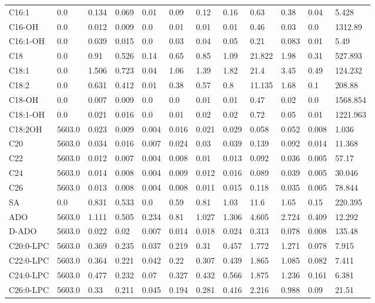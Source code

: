 \begin{tabular}{llllllllllll}
C16:1 & 0.0 & 0.134 & 0.069 & 0.01 & 0.09 & 0.12 & 0.16 & 0.63 & 0.38 & 0.04 & 5.428 \\
C16-OH & 0.0 & 0.012 & 0.009 & 0.0 & 0.01 & 0.01 & 0.01 & 0.46 & 0.03 & 0.0 & 1312.89 \\
C16:1-OH & 0.0 & 0.039 & 0.015 & 0.0 & 0.03 & 0.04 & 0.05 & 0.21 & 0.083 & 0.01 & 5.49 \\
C18 & 0.0 & 0.91 & 0.526 & 0.14 & 0.65 & 0.85 & 1.09 & 21.822 & 1.98 & 0.31 & 527.893 \\
C18:1 & 0.0 & 1.506 & 0.723 & 0.04 & 1.06 & 1.39 & 1.82 & 21.4 & 3.45 & 0.49 & 124.232 \\
C18:2 & 0.0 & 0.631 & 0.412 & 0.01 & 0.38 & 0.57 & 0.8 & 11.135 & 1.68 & 0.1 & 208.88 \\
C18-OH & 0.0 & 0.007 & 0.009 & 0.0 & 0.0 & 0.01 & 0.01 & 0.47 & 0.02 & 0.0 & 1568.854 \\
C18:1-OH & 0.0 & 0.021 & 0.016 & 0.0 & 0.01 & 0.02 & 0.02 & 0.72 & 0.05 & 0.01 & 1221.963 \\
C18:2OH & 5603.0 & 0.023 & 0.009 & 0.004 & 0.016 & 0.021 & 0.029 & 0.058 & 0.052 & 0.008 & 1.036 \\
C20 & 5603.0 & 0.034 & 0.016 & 0.007 & 0.024 & 0.03 & 0.039 & 0.139 & 0.092 & 0.014 & 11.368 \\
C22 & 5603.0 & 0.012 & 0.007 & 0.004 & 0.008 & 0.01 & 0.013 & 0.092 & 0.036 & 0.005 & 57.17 \\
C24 & 5603.0 & 0.014 & 0.008 & 0.004 & 0.009 & 0.012 & 0.016 & 0.089 & 0.039 & 0.005 & 30.046 \\
C26 & 5603.0 & 0.013 & 0.008 & 0.004 & 0.008 & 0.011 & 0.015 & 0.118 & 0.035 & 0.005 & 78.844 \\
SA & 0.0 & 0.831 & 0.533 & 0.0 & 0.59 & 0.81 & 1.03 & 11.6 & 1.65 & 0.15 & 220.395 \\
ADO & 5603.0 & 1.111 & 0.505 & 0.234 & 0.81 & 1.027 & 1.306 & 4.605 & 2.724 & 0.409 & 12.292 \\
D-ADO & 5603.0 & 0.022 & 0.02 & 0.007 & 0.014 & 0.018 & 0.024 & 0.313 & 0.078 & 0.008 & 135.48 \\
C20:0-LPC & 5603.0 & 0.369 & 0.235 & 0.037 & 0.219 & 0.31 & 0.457 & 1.772 & 1.271 & 0.078 & 7.915 \\
C22:0-LPC & 5603.0 & 0.364 & 0.221 & 0.042 & 0.22 & 0.307 & 0.439 & 1.865 & 1.085 & 0.082 & 7.411 \\
C24:0-LPC & 5603.0 & 0.477 & 0.232 & 0.07 & 0.327 & 0.432 & 0.566 & 1.875 & 1.236 & 0.161 & 6.381 \\
C26:0-LPC & 5603.0 & 0.33 & 0.211 & 0.045 & 0.194 & 0.281 & 0.416 & 2.216 & 0.988 & 0.09 & 21.51 \\

\end{tabular}
